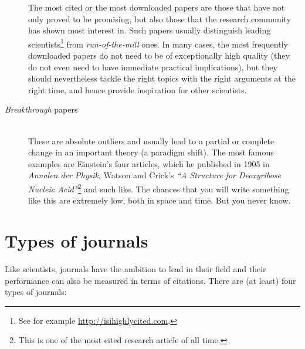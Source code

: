 \documentclass[graybox,envcountchap,sectrefs,UStrade]{svmono}
\begin{document}
\begin{description}
     The most cited \citep{Garfield1990CC} or the most downloaded papers are those that have not only proved to be promising, but also those that the research community has shown most interest in. Such papers usually distinguish leading scientists\footnote{See for example \url{http://isihighlycited.com}.} from \emph{run-of-the-mill} ones. In many cases, the most frequently downloaded papers do not need to be of exceptionally high quality (they do not even need to have immediate practical implications), but they should nevertheless tackle the right topics with the right arguments at the right time, and hence provide inspiration for other scientists.\medskip
\item[\emph{Breakthrough} papers]  \hfill \\
    These are absolute outliers and usually lead to a partial or complete change in an important theory (a paradigm shift). The most famous examples are Einstein's four articles, which he published in 1905 in \emph{Annalen der Physik}, Watson and Crick's \emph{``A Structure for Deoxyribose Nucleic Acid''}\footnote{This is one of the most cited research article of all time.} and such like. The chances that you will write something like this are extremely low, both in space and time. But you never know.
\end{description}


 \section{Types of journals}

Like scientists, journals have the ambition to lead in their field and their performance can also be measured in terms of citations. There are (at least) four types of journals:
\end{document}
